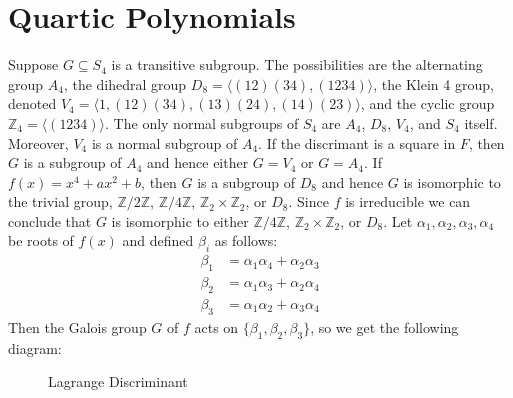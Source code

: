 \documentclass{article}                                                        %
\begin{document}
    \section{Quartic Polynomials}
        Suppose $G\subseteq{S}_{4}$ is a transitive subgroup. The possibilities
        are the alternating group $A_{4}$, the dihedral group
        $D_{8}=\langle(12)(34),(1234)\rangle$, the Klein 4 group, denoted
        $V_{4}=\langle{1},(12)(34),(13)(24),(14)(23)\rangle$, and the cyclic
        group $\mathbb{Z}_{4}=\langle{(1234)}\rangle$. The only normal subgroups
        of $S_{4}$ are $A_{4}$, $D_{8}$, $V_{4}$, and $S_{4}$ itself. Moreover,
        $V_{4}$ is a normal subgroup of $A_{4}$. If the discrimant is a square
        in $F$, then $G$ is a subgroup of $A_{4}$ and hence either $G=V_{4}$ or
        $G=A_{4}$. If $f(x)=x^{4}+ax^{2}+b$, then $G$ is a subgroup of $D_{8}$
        and hence $G$ is isomorphic to the trivial group,
        $\mathbb{Z}/2\mathbb{Z}$, $\mathbb{Z}/4\mathbb{Z}$,
        $\mathbb{Z}_{2}\times\mathbb{Z}_{2}$, or $D_{8}$. Since $f$ is
        irreducible we can conclude that $G$ is isomorphic to either
        $\mathbb{Z}/4\mathbb{Z}$, $\mathbb{Z}_{2}\times\mathbb{Z}_{2}$, or
        $D_{8}$. Let $\alpha_{1},\alpha_{2},\alpha_{3},\alpha_{4}$ be roots of
        $f(x)$ and defined $\beta_{i}$ as follows:
        \begin{subequations}
            \begin{align}
                \beta_{1}&=\alpha_{1}\alpha_{4}+\alpha_{2}\alpha_{3}\\
                \beta_{2}&=\alpha_{1}\alpha_{3}+\alpha_{2}\alpha_{4}\\
                \beta_{3}&=\alpha_{1}\alpha_{2}+\alpha_{3}\alpha_{4}
            \end{align}
        \end{subequations}
        Then the Galois group $G$ of $f$ acts on
        $\{\beta_{1},\beta_{2},\beta_{3}\}$, so we get the following diagram:
        \begin{figure}[H]
            \centering
            \captionsetup{type=figure}
            \caption{Lagrange Discriminant}
        \end{figure}
\end{document}

